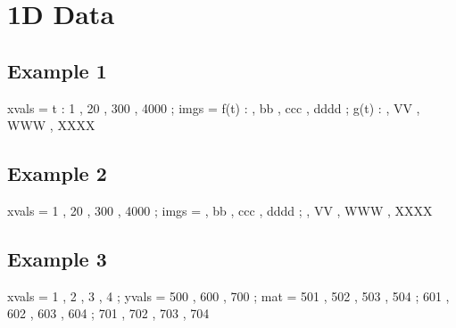 \documentclass[12pt]{article}
\begin{document}


\section{1D Data}

\subsection{Example 1}

\begin{functable}
    xvals =    t : 1 , 20 , 300 , 4000 ;
    imgs  = f(t) :  , bb , ccc , dddd ;
            g(t) :  , VV , WWW , XXXX
\end{functable}


\newpage
\subsection{Example 2}

\begin{functable}
    xvals = 1 , 20 , 300 , 4000 ;
    imgs  =  , bb , ccc , dddd ;
             , VV , WWW , XXXX
\end{functable}


\newpage
\subsection{Example 3}

\begin{functable}
    xvals = 1  , 2  , 3  , 4 ;
    yvals = 500 , 600 , 700 ;
    mat   = 501 , 502 , 503 , 504 ;
            601 , 602 , 603 , 604 ;
            701 , 702 , 703 , 704
\end{functable}


%


%
%
%
\end{document}
